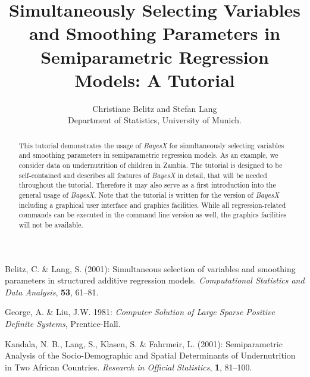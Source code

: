 \documentclass[a4paper]{article}
\begin{document}
\title{Simultaneously Selecting Variables and Smoothing Parameters in Semiparametric Regression Models: A Tutorial}
\author{Christiane Belitz and Stefan Lang\\ [.25cm]
\normalsize Department of Statistics, University of Munich. } \maketitle

\begin{abstract}
This tutorial demonstrates the usage of {\it BayesX} for simultaneously selecting variables and smoothing parameters in
semiparametric regression models. As an example, we consider data on undernutrition of children in Zambia. The tutorial is
designed to be self-contained and describes all features of {\it BayesX} in detail, that will be needed throughout the
tutorial. Therefore it may also serve as a first introduction into the general usage of {\it BayesX}. Note that the tutorial is
written for the version of {\it BayesX} including a graphical user interface and graphics facilities. While all
regression-related commands can be executed in the command line version as well, the graphics facilities will not be available.
\end{abstract}

\tableofcontents

\newpage




\begin{thebibliography}{99}

 Belitz, C. \& Lang, S.  (2001): Simultaneous selection of variables and smoothing
parameters in structured additive regression models. {\it Computational Statistics and Data Analysis}, {\bf 53}, 61--81.

 George, A. \& Liu, J.W. 1981: {\it Computer Solution of Large Sparse Positive
Definite Systems}, Prentice-Hall.

 Kandala, N. B., Lang, S., Klasen, S. \& Fahrmeir, L. (2001): Semiparametric
Analysis of the Socio-Demographic and Spatial Determinants of Undernutrition in Two African Countries. {\it Research in
Official Statistics}, {\bf 1}, 81--100.


\end{thebibliography}
\end{document}
